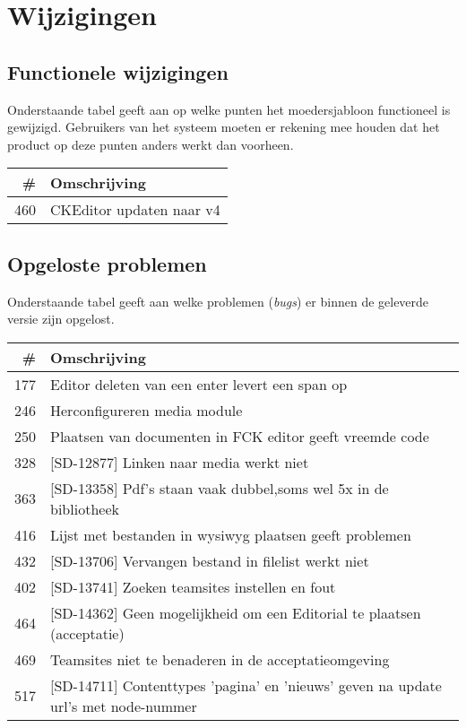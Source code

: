 \documentclass[12pt]{article}
\begin{document}
\section{Wijzigingen}
\subsection{Functionele wijzigingen}
Onderstaande tabel geeft aan op welke punten het moedersjabloon functioneel is gewijzigd. Gebruikers van het systeem moeten er rekening mee houden dat het product op deze punten anders werkt dan voorheen.

\begin{tabular}{| r | p{15cm} |}
	\hline \# & Omschrijving \\ \hline \hline
	460 & CKEditor updaten naar v4 \\ \hline
\end{tabular}

\subsection{Opgeloste problemen}
Onderstaande tabel geeft aan welke problemen (\emph{bugs}) er binnen de geleverde versie zijn opgelost.

\begin{tabular}{| r | p{15cm} |}
	\hline \# & Omschrijving \\ \hline \hline
	177 & Editor deleten van een enter levert een span op \\ \hline
	246 & Herconfigureren media module \\ \hline
	250 & Plaatsen van documenten in FCK editor geeft vreemde code \\ \hline
	328 & [SD-12877] Linken naar media werkt niet \\ \hline
	363 & [SD-13358] Pdf's staan vaak dubbel,soms wel 5x in de bibliotheek \\ \hline
	416 & Lijst met bestanden in wysiwyg plaatsen geeft problemen \\ \hline
	432 & [SD-13706] Vervangen bestand in filelist werkt niet \\ \hline
	402 & [SD-13741] Zoeken teamsites instellen en fout \\ \hline
	464 & [SD-14362] Geen mogelijkheid om een Editorial te plaatsen (acceptatie) \\ \hline
	469 & Teamsites niet te benaderen in de acceptatieomgeving \\ \hline
	517 & [SD-14711] Contenttypes 'pagina' en 'nieuws' geven na update url's met node-nummer \\ \hline
\end{tabular}
\end{document}
